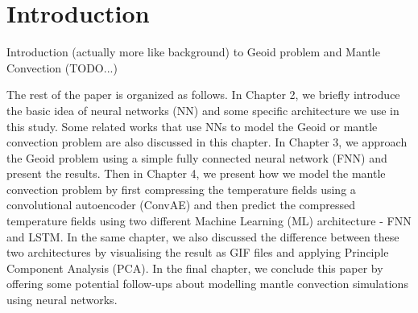 \chapter{Introduction}

Introduction (actually more like background) to Geoid problem and Mantle Convection (TODO...)

The rest of the paper is organized as follows. In Chapter 2, we briefly introduce the basic idea of neural networks (NN) and some specific architecture we use in this study. Some related works that use NNs to model the Geoid or mantle convection problem are also discussed in this chapter. In Chapter 3, we approach the Geoid problem using a simple fully connected neural network (FNN) and present the results. Then in Chapter 4, we present how we model the mantle convection problem by first compressing the temperature fields using a convolutional autoencoder (ConvAE) and then predict the compressed temperature fields using two different Machine Learning (ML) architecture - FNN and LSTM. In the same chapter, we also discussed the difference between these two architectures by visualising the result as GIF files and applying Principle Component Analysis (PCA). In the final chapter, we conclude this paper by offering some potential follow-ups about modelling mantle convection simulations using neural networks.



